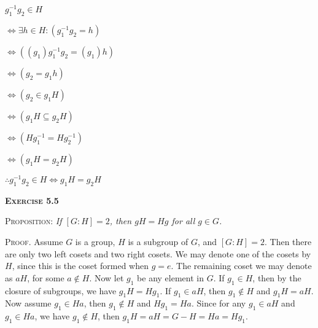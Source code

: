 \documentclass[12pt, a4paper]{article}
\begin{document}
$g^{-1}_1g_2\in H$\par
\vspace{5mm}
\hspace{8.2mm}$\Leftrightarrow \exists h\in H\colon (g^{-1}_1g_2=h)$\par
\vspace{5mm}
\hspace{8.2mm}$\Leftrightarrow ((g_1)g^{-1}_1g_2=(g_1)h)$\par
\vspace{5mm}
\hspace{8.2mm}$\Leftrightarrow (g_2=g_1h)$\par
\vspace{5mm}
\hspace{8.2mm}$\Leftrightarrow (g_2\in g_1H)$\par
\vspace{5mm}
\hspace{8.2mm}$\Leftrightarrow (g_1H\subseteq g_2H)$\par
\vspace{5mm}
\hspace{8.2mm}$\Leftrightarrow (Hg^{-1}_1=Hg^{-1}_2)$\par
\vspace{5mm}
\hspace{8.2mm}$\Leftrightarrow (g_1H=g_2H)$\par
\vspace{5mm}
\hspace{8.2mm}$\therefore g^{-1}_1g_2\in H\Longleftrightarrow g_1H=g_2H$\par

\vspace{8mm}

\begin{flushleft}
\textsc{\textbf{Exercise 5.5}}
\end{flushleft}

\textsc{Proposition: }\textit{If $[G\colon H]=2$, then $gH=Hg$ for all $g\in G$.}

\vspace{6mm}

\textsc{Proof. } Assume $G$ is a group, $H$ is a subgroup of $G$, and $[G\colon H]=2$. Then there are only two left cosets and two right cosets. We may denote one of the cosets by $H$, since this is the coset formed when $g=e$. The remaining coset we may denote as $aH$, for some $a\not\in H$. Now let $g_1$ be any element in $G$. If $g_1\in H$, then by the closure of subgroups, we have $g_1H=Hg_1$. If $g_1\in aH$, then $g_1\not\in H$ and $g_1H=aH$. Now assume $g_1\in Ha$, then $g_1\not\in H$ and $Hg_1=Ha$. Since for any $g_1\in aH$ and $g_1\in Ha$, we have $g_1\not\in H$, then $g_1H=aH=G-H=Ha=Hg_1$.
\end{document}
